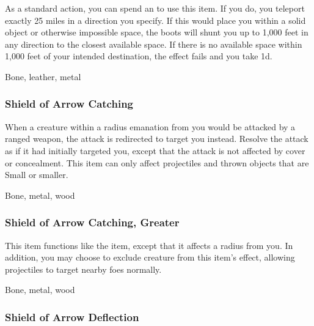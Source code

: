 As a standard action, you can spend an  to use this item.
If you do, you teleport exactly 25 miles in a direction you specify.
If this would place you within a solid object or otherwise impossible space, the boots will shunt you up to 1,000 feet in any direction to the closest available space.
If there is no available space within 1,000 feet of your intended destination, the effect fails and you take  \minus1d.



 


 Bone, leather, metal


\lowercase{\hypertarget{item:Shield of Arrow Catching}{}}\label{item:Shield of Arrow Catching}
\hypertarget{item:Shield of Arrow Catching}{\subsubsection{Shield of Arrow Catching\hfill{}}}

When a creature within a \areamed radius emanation from you would be attacked by a ranged weapon, the attack is redirected to target you instead.
Resolve the attack as if it had initially targeted you, except that the attack is not affected by cover or concealment.
This item can only affect projectiles and thrown objects that are Small or smaller.



 Bone, metal, wood


\lowercase{\hypertarget{item:Shield of Arrow Catching, Greater}{}}\label{item:Shield of Arrow Catching, Greater}
\hypertarget{item:Shield of Arrow Catching, Greater}{\subsubsection{Shield of Arrow Catching, Greater\hfill{}}}

This item functions like the  item, except that it affects a \arealarge radius from you.
In addition, you may choose to exclude creature from this item's effect, allowing projectiles to target nearby foes normally.



 Bone, metal, wood


\lowercase{\hypertarget{item:Shield of Arrow Deflection}{}}\label{item:Shield of Arrow Deflection}
\hypertarget{item:Shield of Arrow Deflection}{\subsubsection{Shield of Arrow Deflection\hfill{}}}

